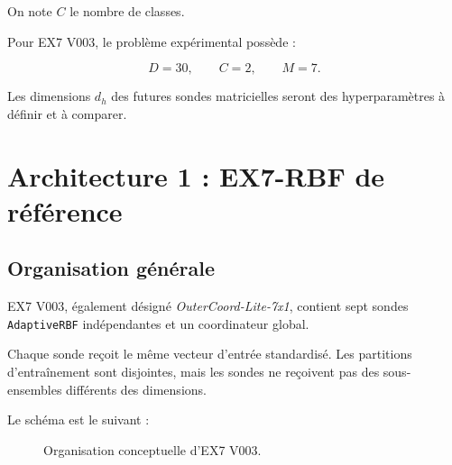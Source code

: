 \documentclass[11pt,a4paper]{article}
\begin{document}
On note \(C\) le nombre de classes.

Pour EX7 V003, le problème expérimental possède :

\[
D=30,\qquad C=2,\qquad M=7.
\]

Les dimensions \(d_h\) des futures sondes matricielles seront
des hyperparamètres à définir et à comparer.

\section{Architecture 1 : EX7-RBF de référence}

\subsection{Organisation générale}

EX7 V003, également désigné
\textit{OuterCoord-Lite-7x1}, contient sept sondes
\texttt{AdaptiveRBF} indépendantes et un coordinateur global.

Chaque sonde reçoit le même vecteur d'entrée standardisé.
Les partitions d'entraînement sont disjointes, mais les sondes
ne reçoivent pas des sous-ensembles différents des dimensions.

Le schéma est le suivant :

\begin{figure}[H]
\centering
{}
\caption{Organisation conceptuelle d'EX7 V003.}
\end{figure}
\end{document}
